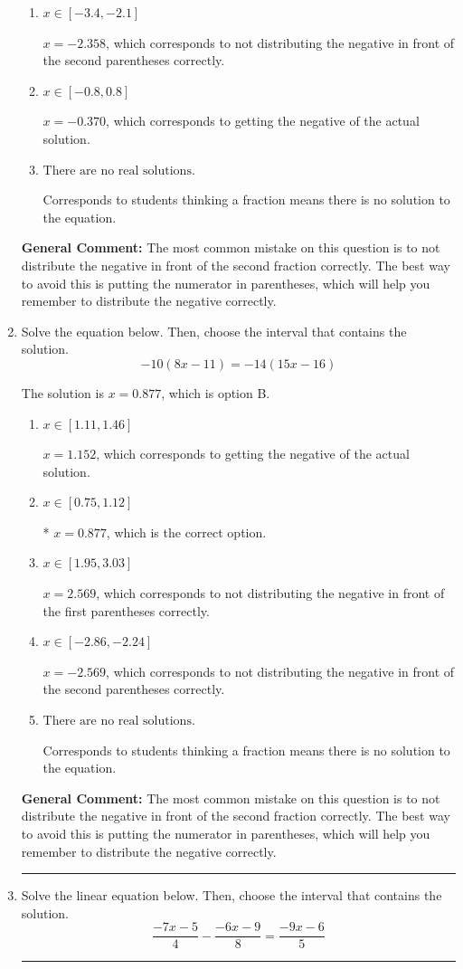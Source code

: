 \documentclass{extbook}[14pt]
\newcommand{\litem}[1]{\item #1

\rule{\textwidth}{0.4pt}}
\begin{document}
\begin{enumerate}
{\begin{enumerate}[label=\Alph*.]
$x = 2.358$, which corresponds to not distributing the negative in front of the first parentheses correctly.
\item \( x \in [-3.4, -2.1] \)

$x = -2.358$, which corresponds to not distributing the negative in front of the second parentheses correctly.
\item \( x \in [-0.8, 0.8] \)

$x = -0.370$, which corresponds to getting the negative of the actual solution.
\item \( \text{There are no real solutions.} \)

Corresponds to students thinking a fraction means there is no solution to the equation.
\end{enumerate}

\textbf{General Comment:} The most common mistake on this question is to not distribute the negative in front of the second fraction correctly. The best way to avoid this is putting the numerator in parentheses, which will help you remember to distribute the negative correctly.
}
\litem{
Solve the equation below. Then, choose the interval that contains the solution.
\[ -10(8x -11) = -14(15x -16) \]

The solution is \( x = 0.877 \), which is option B.\begin{enumerate}[label=\Alph*.]
\item \( x \in [1.11, 1.46] \)

$x = 1.152$, which corresponds to getting the negative of the actual solution.
\item \( x \in [0.75, 1.12] \)

* $x = 0.877$, which is the correct option.
\item \( x \in [1.95, 3.03] \)

$x = 2.569$, which corresponds to not distributing the negative in front of the first parentheses correctly.
\item \( x \in [-2.86, -2.24] \)

$x = -2.569$, which corresponds to not distributing the negative in front of the second parentheses correctly.
\item \( \text{There are no real solutions.} \)

Corresponds to students thinking a fraction means there is no solution to the equation.
\end{enumerate}

\textbf{General Comment:} The most common mistake on this question is to not distribute the negative in front of the second fraction correctly. The best way to avoid this is putting the numerator in parentheses, which will help you remember to distribute the negative correctly.
}
\litem{
Solve the linear equation below. Then, choose the interval that contains the solution.
\[ \frac{-7x -5}{4} - \frac{-6x -9}{8} = \frac{-9x -6}{5} \]

}
\end{enumerate}
\end{document}
